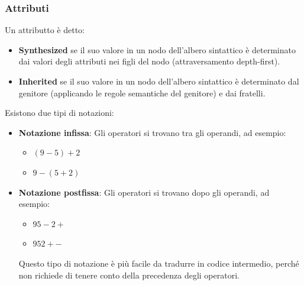 \documentclass[a4paper]{article}
\begin{document}
\subsubsection{Attributi}
Un attributto è detto:
\begin{itemize}
  \item \textbf{Synthesized} se il suo valore in un nodo dell'albero sintattico è
    determinato dai valori degli attributi nei figli del nodo (attraversamento depth-first).

  \item \textbf{Inherited} se il suo valore in un nodo dell'albero sintattico è determinato
    dal genitore (applicando le regole semantiche del genitore) e dai fratelli.
\end{itemize}
Esistono due tipi di notazioni:
\begin{itemize}
  \item \textbf{Notazione infissa}: Gli operatori si trovano tra gli operandi, ad esempio:
    \begin{itemize}
      \item \( (9 - 5) + 2 \) 
      \item \( 9 - (5 + 2) \) 
    \end{itemize}

  \item \textbf{Notazione postfissa}: Gli operatori si trovano dopo gli operandi, ad esempio:
    \begin{itemize}
      \item \( 9 5 - 2 + \) 
      \item \( 9 5 2 + - \)
    \end{itemize}
    Questo tipo di notazione è più facile da tradurre in codice intermedio, perché non
    richiede di tenere conto della precedenza degli operatori.
\end{itemize}
\end{document}
